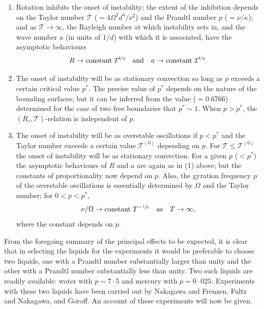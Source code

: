 \begin{enumerate}
\item[(1)] Rotation inhibits the onset of instability; the extent of the
  inhibition depends on the Taylor number $\mathscr{T}$ ($= 4\Omega^2 d^4/\nu^2$) and the
  Prandtl number $p$ ($= \nu/\kappa$); and as $\mathscr{T} \to \infty$, the Rayleigh number at which
  instability sets in, and the wave number $a$ (in units of $1/d$) with which it
  is associated, have the asymptotic behaviours
  \begin{equation}
    R \to \text{constant}\; \mathscr{T}^{\!\nicefrac{2}{3}}
    \quad \text{and} \quad
    a \to \text{constant}\; \mathscr{T}^{\!\nicefrac{1}{6}}.
    \label{eq:3-308}
  \end{equation}

\item[(2)] The onset of instability will be as stationary convection so long
  as $p$ exceeds a certain critical value $p^*$.  The precise value of $p^*$ depends
  on the nature of the bounding surfaces; but it can be inferred from the
  value ($= 0.6766$) determined for the case of two free boundaries that
  $p^* \sim 1$.  When $p > p^*$, the $(R_c, \mathscr{T})$-relation is independent of $p$.

\item[(3)] The onset of instability will be as overstable oscillations if $p < p^*$
  and the Taylor number exceeds a certain value $\mathscr{T}^{(0)}$ depending on $p$.  For
  $\mathscr{T} \leq \mathscr{T}^{(0)}$ the onset of instability will be as stationary convection.  For a
  given $p$ ($< p^*$) the asymptotic behaviours of $R$ and $a$ are again as in (1)
  above; but the constants of proportionality now depend on $p$.  Also, the
  gyration frequency $p$ of the overstable oscillations is essentially deter\-mined
  by $\Omega$ and the Taylor number; for $0 < p < p^*$,
  \begin{equation}
    \nu/\Omega \to \text{constant}\; \mathscr{T}^{-\nicefrac{1}{6}}
    \quad \text{as} \quad \mathscr{T} \to \infty,
    \label{eq:3-309}
  \end{equation}
  where the constant depends on $p$.
\end{enumerate}

From the foregoing summary of the principal effects to be expected,
it is clear that in selecting the liquids for the experiments it would be
preferable to choose two liquids, one with a Prandtl number substantially
larger than unity and the other with a Prandtl number substantially less
than unity.  Two such liquids are readily available: water with $p \sim 7{\cdot}5$
and mercury with $p = 0{\cdot}025$.  Experiments with these two liquids have
been carried out by Nakagawa and Frenzen, Fultz and Nakagawa, and
Goroff.  An account of these experiments will now be given.

